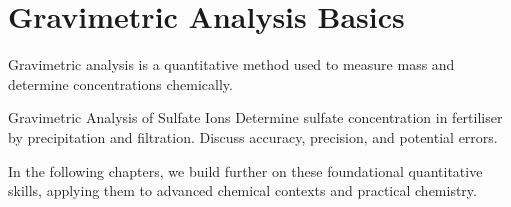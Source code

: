 \FloatBarrier

\section{Gravimetric Analysis Basics}
\FloatBarrier
\FloatBarrier
\FloatBarrier

Gravimetric analysis is a quantitative method used to measure mass and determine concentrations chemically.

\begin{investigation}{Gravimetric Analysis of Sulfate Ions}
Determine sulfate concentration in fertiliser by precipitation and filtration. Discuss accuracy, precision, and potential errors.
\end{investigation}


In the following chapters, we build further on these foundational quantitative skills, applying them to advanced chemical contexts and practical chemistry.